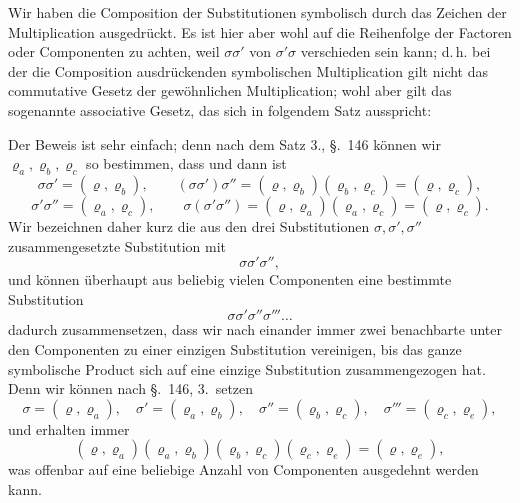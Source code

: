 

Wir haben die Composition der Substitutionen symbolisch durch das Zeichen der Multiplication ausgedrückt. Es ist hier aber wohl auf die Reihenfolge der Factoren oder Componenten zu achten, weil $\sigma \sigma'$ von $\sigma' \sigma$ verschieden sein kann; d.\,h. bei der die Composition ausdrückenden symbolischen Multiplication gilt nicht das commutative Gesetz der gewöhnlichen Multiplication; wohl aber gilt das sogenannte associative Gesetz, das sich in folgendem Satz ausspricht:

Der Beweis ist sehr einfach; denn nach dem Satz 3., \S.\ 146 können wir $\varrho_a, \varrho_b, \varrho_c$ so bestimmen, dass
und dann ist
\[
\sigma \sigma' = (\varrho, \varrho_b), \qquad (\sigma \sigma') \sigma'' = (\varrho, \varrho_b)(\varrho_b, \varrho_c) = (\varrho, \varrho_c),
\]
\[
\sigma' \sigma'' = (\varrho_a, \varrho_c), \qquad \sigma (\sigma' \sigma'') = (\varrho, \varrho_a)(\varrho_a, \varrho_c) = (\varrho, \varrho_c).
\]
Wir bezeichnen daher kurz die aus den drei Substitutionen $\sigma, \sigma', \sigma''$ zusammengesetzte Substitution mit
\[
\sigma \sigma' \sigma'',
\]
und können überhaupt aus beliebig vielen Componenten eine bestimmte Substitution
\[
\sigma \sigma' \sigma'' \sigma''' \ldots
\]
dadurch zusammensetzen, dass wir nach einander immer zwei benachbarte unter den Componenten zu einer einzigen Substitution vereinigen, bis das ganze symbolische Product sich auf eine einzige Substitution zusammengezogen hat. Denn wir können nach \S.\ 146, 3.\ setzen
\[
\sigma = (\varrho, \varrho_a), \quad \sigma' = (\varrho_a, \varrho_b), \quad \sigma'' = (\varrho_b, \varrho_c), \quad \sigma''' = (\varrho_c, \varrho_e),
\]
und erhalten immer
\[
(\varrho, \varrho_a)(\varrho_a, \varrho_b)(\varrho_b, \varrho_c)(\varrho_c, \varrho_e) = (\varrho, \varrho_e),
\]
was offenbar auf eine beliebige Anzahl von Componenten ausgedehnt werden kann.
